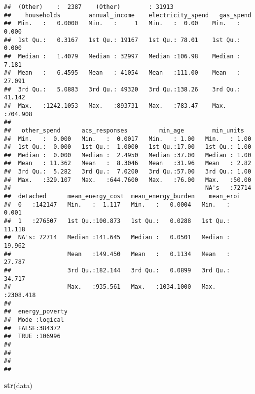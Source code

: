 \documentclass[]{article}
\newenvironment{Shaded}{\begin{snugshade}}{\end{snugshade}}
\newcommand{\KeywordTok}[1]{\textcolor[rgb]{0.13,0.29,0.53}{\textbf{#1}}}
\newcommand{\NormalTok}[1]{#1}
\begin{document}
\begin{verbatim}
##  (Other)    :  2387    (Other)        : 31913                       
##    households        annual_income    electricity_spend   gas_spend      
##  Min.   :   0.0000   Min.   :     1   Min.   :  0.00    Min.   :  0.000  
##  1st Qu.:   0.3167   1st Qu.: 19167   1st Qu.: 78.01    1st Qu.:  0.000  
##  Median :   1.4079   Median : 32997   Median :106.98    Median :  7.181  
##  Mean   :   6.4595   Mean   : 41054   Mean   :111.00    Mean   : 27.091  
##  3rd Qu.:   5.0883   3rd Qu.: 49320   3rd Qu.:138.26    3rd Qu.: 41.142  
##  Max.   :1242.1053   Max.   :893731   Max.   :783.47    Max.   :704.908  
##                                                                          
##   other_spend      acs_responses         min_age        min_units    
##  Min.   :  0.000   Min.   :  0.0017   Min.   : 1.00   Min.   : 1.00  
##  1st Qu.:  0.000   1st Qu.:  1.0000   1st Qu.:17.00   1st Qu.: 1.00  
##  Median :  0.000   Median :  2.4950   Median :37.00   Median : 1.00  
##  Mean   : 11.362   Mean   :  8.3046   Mean   :31.96   Mean   : 2.82  
##  3rd Qu.:  5.282   3rd Qu.:  7.0200   3rd Qu.:57.00   3rd Qu.: 1.00  
##  Max.   :329.107   Max.   :644.7600   Max.   :76.00   Max.   :50.00  
##                                                       NA's   :72714  
##  detached      mean_energy_cost  mean_energy_burden    mean_eroi       
##  0   :142147   Min.   :  1.117   Min.   :   0.0004   Min.   :   0.001  
##  1   :276507   1st Qu.:100.873   1st Qu.:   0.0288   1st Qu.:  11.118  
##  NA's: 72714   Median :141.645   Median :   0.0501   Median :  19.962  
##                Mean   :149.450   Mean   :   0.1134   Mean   :  27.787  
##                3rd Qu.:182.144   3rd Qu.:   0.0899   3rd Qu.:  34.717  
##                Max.   :935.561   Max.   :1034.1000   Max.   :2308.418  
##                                                                        
##  energy_poverty 
##  Mode :logical  
##  FALSE:384372   
##  TRUE :106996   
##                 
##                 
##                 
## 
\end{verbatim}

\begin{Shaded}
\begin{Highlighting}[]
\KeywordTok{str}\NormalTok{(data)}
\end{Highlighting}
\end{Shaded}
\end{document}
